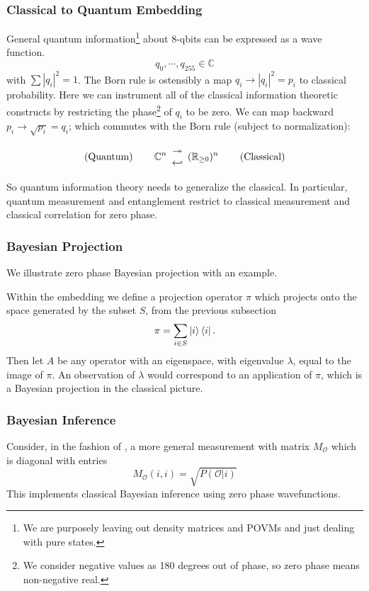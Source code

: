 \documentclass[12pt,a4paper]{article}
\begin{document}
\subsubsection{Classical to Quantum Embedding}
General quantum information\footnote{We are purposely leaving out density matrices and POVMs and just dealing with pure states.} about 8-qbits can be expressed as a wave function.
\[
   q_0,\cdots,q_{255} \in \mathbb{C}
\]
with $\sum |q_i|^2 = 1$.  The Born rule is ostensibly a map $q_i \rightarrow |q_i|^2 = p_i$ to classical probability.  Here we can instrument all of the classical information theoretic constructs by restricting the phase\footnote{We consider negative values as 180 degrees out of phase, so zero phase means non-negative real.} of $q_i$ to be zero.  We can map backward $p_i \rightarrow \sqrt{p_i} = q_i$; which commutes with the Born rule (subject to normalization):

{
\renewcommand{\arraystretch}{0.1}
\[
\text{(Quantum)} \hspace{0.3 in}
\mathbb{C}^n \begin{array}{c} \twoheadrightarrow \\ \hookleftarrow \end{array}
(\mathbb{R}_{\ge 0})^n
\hspace{0.3 in} \text{(Classical)} 
\]
}

So quantum information theory needs to generalize the classical.  In particular, quantum measurement and entanglement restrict to classical measurement and classical correlation for zero phase.

\subsubsection{Bayesian Projection}
We illustrate zero phase Bayesian projection with an example.

Within the embedding we define a projection operator $\pi$ which projects onto the space generated by the subset $S$, from the previous subsection
\[
\pi = \sum_{i \in S} \ket{i} \bra{i}.
\]
Then let $A$ be any operator with an eigenspace, with eigenvalue $\lambda$, equal to the image of $\pi$.  An observation of $\lambda$ would correspond to an application of $\pi$, which is a Bayesian projection in the classical picture.

\subsubsection{Bayesian Inference}
Consider, in the fashion of \cite{nielsenchuang}, a more general measurement with matrix $M_\mathcal{O}$ which is diagonal with entries
\[
   M_\mathcal{O}(i,i) = \sqrt{P(\mathcal{O} | i)}
\]
This implements classical Bayesian inference using zero phase wavefunctions.
\end{document}
